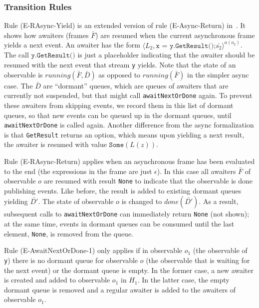 \documentclass{acm_proc_article-sp}
\newcommand{\aframe}[3]{\langle #1, #2 \rangle ^{#3}}
\begin{document}
\subsubsection{Transition Rules}

Rule (E-RAsync-Yield) is an extended version of rule (E-Async-Return)
in~\cite{FormalizingAsync}. It shows how awaiters (frames $\bar{F}$) are
resumed when the current asynchronous frame yields a next event. An awaiter
has the form \newline $\aframe {L_2} {\texttt{x = y.GetResult();} \bar{s_2}} {a(o_2)}$.
The call $\texttt{y.GetResult()}$ is just a placeholder indicating that
the awaiter should be resumed with the next event that stream \verb|y| yields.
Note that the state of an observable is $running(\bar{F}, \bar{D})$ as opposed
to $running(\bar{F})$ in the simpler async case. The $\bar{D}$ are ``dormant''
queues, which are queues of awaiters that are currently not suspended, but
that might call \verb|awaitNextOrDone| again. To prevent these awaiters from
skipping events, we record them in this list of dormant queues, so that new
events can be queued up in the dormant queues, until \verb|awaitNextOrDone| is
called again. Another difference from the async formalization is that
\verb|GetResult| returns an option, which means upon yielding a next result,
the awaiter is resumed with value $\texttt{Some}(L(z))$.

Rule (E-RAsync-Return) applies when an asynchronous frame has been evaluated
to the end (the expressions in the frame are just $\epsilon$). In this case
all awaiters $\bar{F}$ of observable $o$ are resumed with result \texttt{None}
to indicate that the observable is done publishing events. Like before, the
result is added to existing dormant queues yielding $\bar{D'}$. The state of
observable $o$ is changed to $done(\bar{D'})$. As a result, subsequent calls
to \verb|awaitNextOrDone| can immediately return \texttt{None} (not shown); at
the same time, events in dormant queues can be consumed until the last element,
\texttt{None}, is removed from the queue.

Rule (E-AwaitNextOrDone-1) only applies if in observable $o_1$ (the observable
of \verb|y|) there is no dormant queue for observable $o$ (the observable that
is waiting for the next event) or the dormant queue is empty. In the former
case, a new awaiter is created and added to observable $o_1$ in $H_1$. In the
latter case, the empty dormant queue is removed and a regular awaiter is added
to the awaiters of observable $o_1$.
\end{document}
